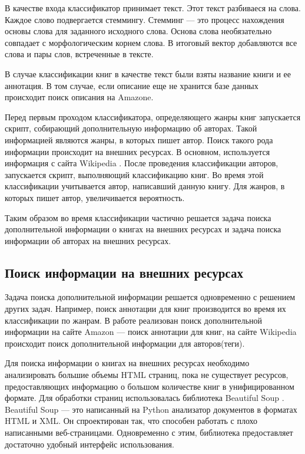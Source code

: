 В качестве входа классификатор принимает текст. Этот текст разбиваеся на слова. Каждое слово подвергается стеммингу. Стемминг \cite{stemming} --- это процесс нахождения основы слова для заданного исходного слова. Основа слова необязательно совпадает с морфологическим корнем слова. В итоговый вектор добавляются все слова и пары слов, встреченные в тексте.

В случае классификации книг в качестве текст были взяты название книги и ее аннотация. В том случае, если описание  еще не хранится базе данных происходит поиск описания на Amazone.

Перед первым проходом классификатора, определяющего жанры книг запускается скрипт, собирающий дополнительную информацию об авторах. Такой информацией являются жанры, в которых пишет автор. Поиск такого рода информации происходит на внешних ресурсах. В основном, используется информация с сайта Wikipedia \cite{wiki}. После проведения классификации авторов, запускается скрипт, выполняющий классификацию книг. Во время этой классификации учитывается автор, написавший данную книгу. Для жанров, в которых пишет автор, увеличивается вероятность.

Таким образом во время классификации частично решается задача поиска дополнительной информации о книгах на внешних ресурсах и задача поиска информации об авторах на внешних ресурсах.


\subsection{Поиск информации на внешних ресурсах}

Задача поиска дополнительной информации решается одновременно с решением других задач. Например, поиск аннотации для книг производится во время их классификации по жанрам.
В работе реализован поиск дополнительной информации на сайте Amazon \cite{amazon} --- поиск аннотации для книг, на сайте Wikipedia \cite{wiki} происходит поиск дополнительной информации для авторов(теги).

Для поиска информации о книгах на внешних ресурсах необходимо анализировать большие объемы HTML страниц, \tk пока не существует ресурсов, предоставляющих информацию о большом количестве книг в унифицированном формате. Для обработки страниц использовалась библиотека Beautiful Soup \cite{beaut-soup}. Beautiful Soup --- это написанный на Python анализатор документов в форматах HTML и XML. Он спроектирован так, что способен работать с плохо написанными  веб-страницами. Одновременно с этим, библиотека предоставляет достаточно удобный интерфейс использования.


